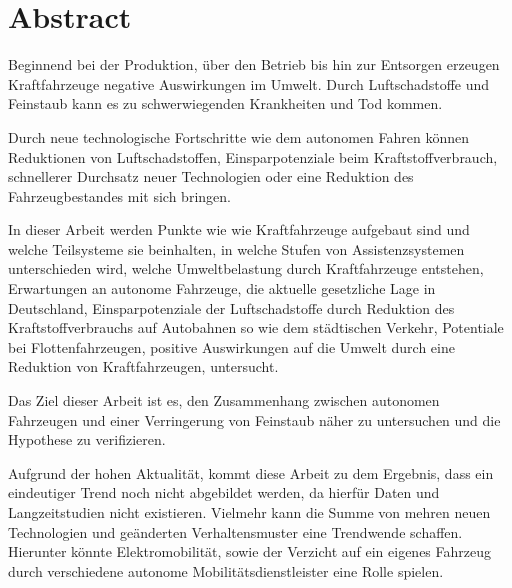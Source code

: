 \chapter*{Abstract}
Beginnend bei der Produktion, über den Betrieb bis hin zur Entsorgen erzeugen Kraftfahrzeuge 
negative Auswirkungen im Umwelt.
Durch Luftschadstoffe und Feinstaub kann es zu schwerwiegenden Krankheiten und Tod kommen.


Durch neue technologische Fortschritte wie dem autonomen Fahren können 
Reduktionen von Luftschadstoffen, 
Einsparpotenziale beim Kraftstoffverbrauch, 
schnellerer Durchsatz neuer Technologien
oder eine Reduktion des Fahrzeugbestandes mit sich bringen.


In dieser Arbeit werden Punkte wie 
wie Kraftfahrzeuge aufgebaut sind und welche Teilsysteme sie beinhalten,
in welche Stufen von Assistenzsystemen unterschieden wird,
welche Umweltbelastung durch Kraftfahrzeuge entstehen,
Erwartungen an autonome Fahrzeuge,
die aktuelle gesetzliche Lage in Deutschland,
Einsparpotenziale der Luftschadstoffe durch Reduktion des Kraftstoffverbrauchs auf Autobahnen so wie dem städtischen Verkehr,
Potentiale bei Flottenfahrzeugen,
positive Auswirkungen auf die Umwelt durch eine Reduktion von Kraftfahrzeugen,
untersucht.


Das Ziel dieser Arbeit ist es, den Zusammenhang zwischen 
autonomen Fahrzeugen und einer Verringerung von Feinstaub näher zu untersuchen und
die Hypothese zu verifizieren.

Aufgrund der hohen Aktualität, kommt diese Arbeit zu dem Ergebnis, 
dass ein eindeutiger Trend noch nicht abgebildet werden, 
da hierfür Daten und Langzeitstudien nicht existieren.
Vielmehr kann die Summe von mehren neuen Technologien und geänderten Verhaltensmuster eine Trendwende schaffen.
Hierunter könnte Elektromobilität, sowie der Verzicht auf ein eigenes Fahrzeug durch verschiedene
autonome Mobilitätsdienstleister eine Rolle spielen.